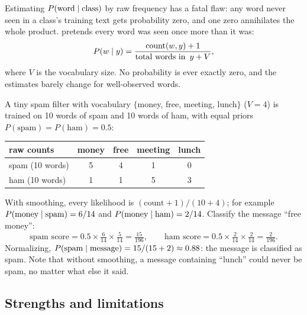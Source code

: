 Estimating $P(\text{word}\mathrel{|}\text{class})$ by raw frequency has a fatal flaw: any word never seen in a class's training text gets probability zero, and one zero annihilates the whole product.  pretends every word was seen once more than it was:
\[
  P(w\mathrel{|} y)
  =\frac{\operatorname{count}(w,y)+1}
        {\operatorname{total\ words\ in\ }y+V},
\]
where $V$ is the vocabulary size. No probability is ever exactly zero, and the estimates barely change for well-observed words.

\begin{workedexample}
A tiny spam filter with vocabulary $\{$money, free, meeting, lunch$\}$ ($V=4$) is trained on 10 words of spam and 10 words of ham, with equal priors $P(\text{spam})=P(\text{ham})=0.5$:

\begin{mltable}
\begin{tabular}{@{}lcccc@{}}
\toprule
\rowcolor{MLPaleBlue!92}
raw counts & money & free & meeting & lunch \\
\midrule
spam (10 words) & 5 & 4 & 1 & 0 \\
ham (10 words) & 1 & 1 & 5 & 3 \\
\bottomrule
\end{tabular}
\end{mltable}

With smoothing, every likelihood is $(\text{count}+1)/(10+4)$; for example $P(\text{money}\mathrel{|}\text{spam})=6/14$ and $P(\text{money}\mathrel{|}\text{ham})=2/14$. Classify the message ``free money'':
\[
  \text{spam score}=0.5\times\tfrac{6}{14}\times\tfrac{5}{14}
  =\tfrac{15}{196},
  \qquad
  \text{ham score}=0.5\times\tfrac{2}{14}\times\tfrac{2}{14}
  =\tfrac{2}{196}.
\]
Normalizing, $P(\text{spam}\mathrel{|}\text{message})=15/(15+2)\approx 0.88$: the message is classified as spam. Note that without smoothing, a message containing ``lunch'' could never be spam, no matter what else it said.
\end{workedexample}

\subsection{Strengths and limitations}

